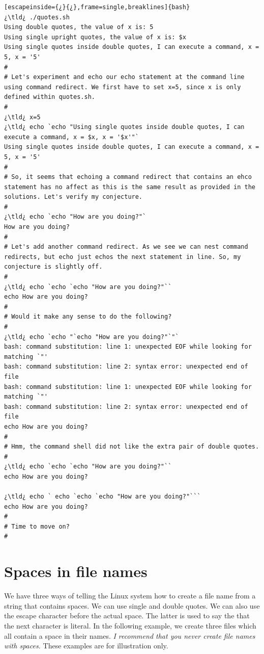 \begin{lstlisting}[escapeinside={¿}{¿},frame=single,breaklines]{bash}
¿\tld¿ ./quotes.sh
Using double quotes, the value of x is: 5
Using single upright quotes, the value of x is: $x
Using single quotes inside double quotes, I can execute a command, x = 5, x = '5'
#
# Let's experiment and echo our echo statement at the command line using command redirect. We first have to set x=5, since x is only defined within quotes.sh.
#
¿\tld¿ x=5
¿\tld¿ echo `echo "Using single quotes inside double quotes, I can execute a command, x = $x, x = '$x'"`
Using single quotes inside double quotes, I can execute a command, x = 5, x = '5'
#
# So, it seems that echoing a command redirect that contains an ehco statement has no affect as this is the same result as provided in the solutions. Let's verify my conjecture.
#
¿\tld¿ echo `echo "How are you doing?"`
How are you doing?
#
# Let's add another command redirect. As we see we can nest command redirects, but echo just echos the next statement in line. So, my conjecture is slightly off.
#
¿\tld¿ echo `echo `echo "How are you doing?"``
echo How are you doing?
#
# Would it make any sense to do the following?
#
¿\tld¿ echo `echo "`echo "How are you doing?"`"`
bash: command substitution: line 1: unexpected EOF while looking for matching `"'
bash: command substitution: line 2: syntax error: unexpected end of file
bash: command substitution: line 1: unexpected EOF while looking for matching `"'
bash: command substitution: line 2: syntax error: unexpected end of file
echo How are you doing?
#
# Hmm, the command shell did not like the extra pair of double quotes.
#
¿\tld¿ echo `echo `echo "How are you doing?"``
echo How are you doing?

¿\tld¿ echo ` echo `echo `echo "How are you doing?"```
echo How are you doing?
#
# Time to move on?
#
\end{lstlisting}

\section{Spaces in file names}

We have three ways of telling the Linux system how to create a file name from a string that contains spaces. We can use single and double quotes. We can also use the escape character before the actual space. The latter is used to say the that the next character is literal. In the following example, we create three files which all contain a space in their names. \textit{I recommend that you never create file names with spaces.} These examples are for illustration only.

